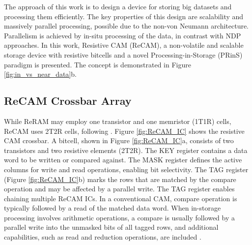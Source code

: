 \documentclass{superfri}
\begin{document}
The approach of this work is to design a device for storing big datasets and processing them efficiently. The key properties of this design are scalability and massively parallel processing, possible due to the non-von Neumann architecture. Parallelism is achieved by in-situ processing of the data, in contrast with NDP approaches. In this work, Resistive CAM (ReCAM), a non-volatile and scalable storage device with resistive bitcells and a novel Processing-in-Storage (PRinS) paradigm is presented. The concept is demonstrated in Figure \ref{fig:in_vs_near_data}b.

\subsection{ReCAM Crossbar Array}
\label{sec:ReCAM_crossbar}
While ReRAM may employ one transistor and one memristor (1T1R) cells, ReCAM uses 2T2R cells, following \cite{akinaga2010resistive}\cite{azarkhish2017logic}. Figure \ref{fig:ReCAM_IC} shows the resistive CAM crossbar. A bitcell, shown in Figure \ref{fig:ReCAM_IC}a, consists of two transistors and two resistive elements (2T2R). The KEY register contains a data word to be written or compared against. The MASK register defines the active columns for write and read operations, enabling bit selectivity. The TAG register (Figure \ref{fig:ReCAM_IC}b) marks the rows that are matched by the compare operation and may be affected by a parallel write. The TAG register enables chaining multiple ReCAM ICs.
In a conventional CAM, compare operation is typically followed by a read of the matched data word. When in-storage processing involves arithmetic operations, a compare is usually followed by a parallel write into the unmasked bits of all tagged rows, and additional capabilities, such as read and reduction operations, are included \cite{yavits2015resistive}. 

\end{document}
